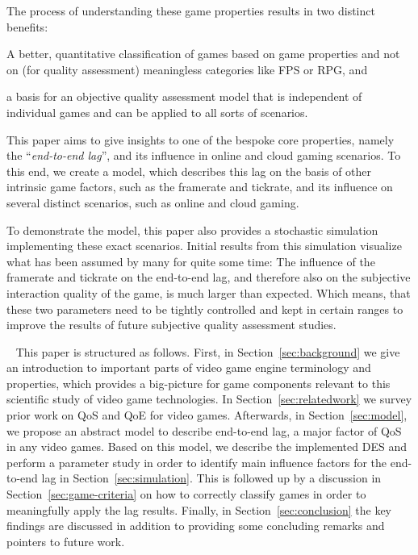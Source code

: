 The process of understanding these game properties results in two distinct benefits:
\begin{enumerate*}
	\item A better, quantitative classification of games based on game properties and not on (for quality assessment) meaningless categories like \gls{FPS} or \gls{RPG}, and
	\item a basis for an objective quality assessment model that is independent of individual games and can be applied to all sorts of scenarios.
\end{enumerate*}

This paper aims to give insights to one of the bespoke core properties, namely the ``\textit{end-to-end lag}'', and its influence in online and cloud gaming scenarios. To this end, we create a model, which describes this lag on the basis of other intrinsic game factors, such as the framerate and tickrate, and its influence on several distinct scenarios, such as online and cloud gaming.

To demonstrate the model, this paper also provides a stochastic simulation implementing these exact scenarios. Initial results from this simulation visualize what has been assumed by many for quite some time: The influence of the framerate and tickrate on the end-to-end lag, and therefore also on the subjective interaction quality of the game, is much larger than expected. Which means, that these two parameters need to be tightly controlled and kept in certain ranges to improve the results of future subjective quality assessment studies.

~\newline
This paper is structured as follows.
First, in Section~\ref{sec:background} we give an introduction to important parts of video game engine terminology and properties, which provides a big-picture for game components relevant to this scientific study of video game technologies.
In Section~\ref{sec:relatedwork} we survey prior work on \gls{QoS} and \gls{QoE} for video games.
Afterwards, in Section~\ref{sec:model}, we propose an abstract model to describe end-to-end lag, a major factor of \gls{QoS} in any video games. Based on this model, we describe the implemented \gls{DES} and perform a parameter study in order to identify main influence factors for the end-to-end lag in Section~\ref{sec:simulation}. This is followed up by a discussion in Section~\ref{sec:game-criteria} on how to correctly classify games in order to meaningfully apply the lag results. Finally, in Section~\ref{sec:conclusion} the key findings are discussed in addition to providing some concluding remarks and pointers to future work.

